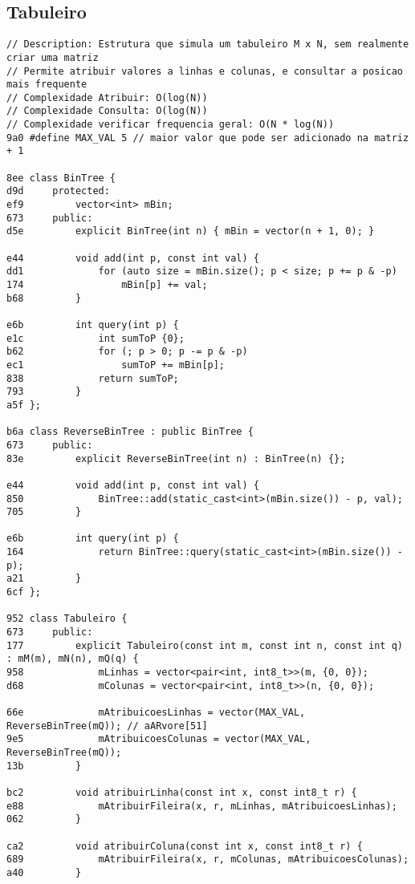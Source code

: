 \documentclass[11pt, a4paper, twoside]{article}
\begin{document}
\subsection{Tabuleiro}
\begin{lstlisting}
// Description: Estrutura que simula um tabuleiro M x N, sem realmente criar uma matriz
// Permite atribuir valores a linhas e colunas, e consultar a posicao mais frequente
// Complexidade Atribuir: O(log(N))
// Complexidade Consulta: O(log(N))
// Complexidade verificar frequencia geral: O(N * log(N))
9a0 #define MAX_VAL 5 // maior valor que pode ser adicionado na matriz + 1

8ee class BinTree {
d9d     protected:
ef9         vector<int> mBin;
673     public:
d5e         explicit BinTree(int n) { mBin = vector(n + 1, 0); }
    
e44         void add(int p, const int val) {
dd1             for (auto size = mBin.size(); p < size; p += p & -p)
174                 mBin[p] += val;
b68         }
    
e6b         int query(int p) {
e1c             int sumToP {0};
b62             for (; p > 0; p -= p & -p)
ec1                 sumToP += mBin[p];
838             return sumToP;
793         }
a5f };

b6a class ReverseBinTree : public BinTree {
673     public:
83e         explicit ReverseBinTree(int n) : BinTree(n) {};
    
e44         void add(int p, const int val) {
850             BinTree::add(static_cast<int>(mBin.size()) - p, val);
705         }
    
e6b         int query(int p) {
164             return BinTree::query(static_cast<int>(mBin.size()) - p);
a21         }
6cf };

952 class Tabuleiro {
673     public:
177         explicit Tabuleiro(const int m, const int n, const int q) : mM(m), mN(n), mQ(q) {
958             mLinhas = vector<pair<int, int8_t>>(m, {0, 0});
d68             mColunas = vector<pair<int, int8_t>>(n, {0, 0});
    
66e             mAtribuicoesLinhas = vector(MAX_VAL, ReverseBinTree(mQ)); // aARvore[51]
9e5             mAtribuicoesColunas = vector(MAX_VAL, ReverseBinTree(mQ));
13b         }
    
bc2         void atribuirLinha(const int x, const int8_t r) {
e88             mAtribuirFileira(x, r, mLinhas, mAtribuicoesLinhas);
062         }
    
ca2         void atribuirColuna(const int x, const int8_t r) {
689             mAtribuirFileira(x, r, mColunas, mAtribuicoesColunas);
a40         }
    

\end{lstlisting}
\end{document}
